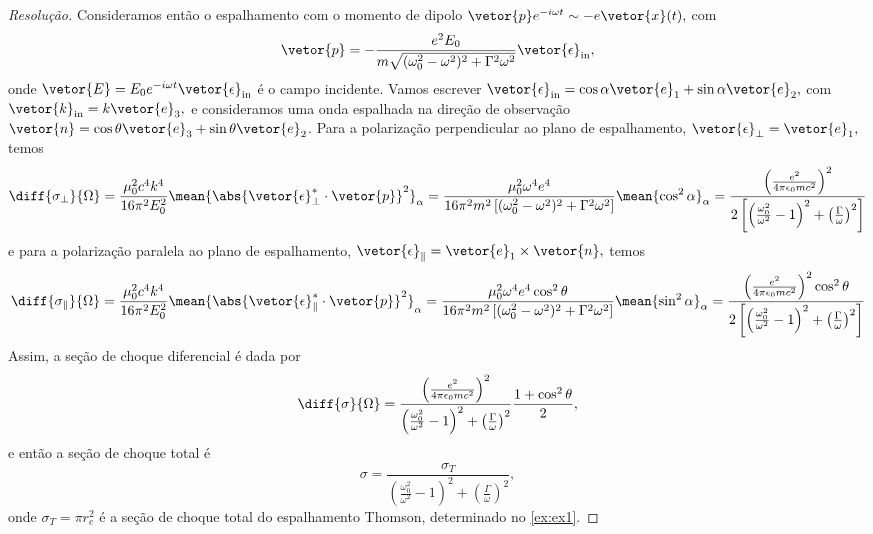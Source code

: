 \begin{proof}[Resolução]
   Consideramos então o espalhamento com o momento de dipolo \(\vetor{p}e^{-i \omega t} \sim -e \vetor{x}(t),\) com
   \begin{equation*}
      \vetor{p} = -\frac{e^2 E_0}{m \sqrt{(\omega_0^2 - \omega^2)^2 + \Gamma^2 \omega^2}}\vetor{\epsilon}_{\mathrm{in}},
   \end{equation*}
   onde \(\vetor{E} = E_0 e^{-i \omega t} \vetor{\epsilon}_\mathrm{in}\) é o campo incidente. Vamos escrever \(\vetor{\epsilon}_{\mathrm{in}} = \cos \alpha \vetor{e}_1 + \sin \alpha \vetor{e}_2,\) com \(\vetor{k}_{\mathrm{in}} = k \vetor{e}_3,\) e consideramos uma onda espalhada na direção de observação \(\vetor{n} = \cos\theta \vetor{e}_3 + \sin\theta \vetor{e}_2\). Para a polarização perpendicular ao plano de espalhamento, \(\vetor{\epsilon}_{\perp} = \vetor{e}_1,\) temos
   \begin{equation*}
      \diff{\sigma_{\perp}}{\Omega} = \frac{\mu_0^2 c^4 k^4}{16 \pi^2 E_0^2}\mean{\abs{\vetor{\epsilon}_{\perp}^* \cdot \vetor{p}}^2}_{\alpha} = \frac{\mu_0^2 \omega^4 e^4}{16 \pi^2 m^2 \left[(\omega_0^2 - \omega^2)^2 + \Gamma^2 \omega^2\right]} \mean{\cos^2 \alpha}_\alpha = \frac{\left(\frac{e^2}{4\pi \epsilon_0 m c^2}\right)^2}{2\left[\left(\frac{\omega_0^2}{\omega^2} - 1\right)^2 + \left(\frac{\Gamma}{\omega}\right)^2\right]}
   \end{equation*}
   e para a polarização paralela ao plano de espalhamento, \(\vetor{\epsilon}_\parallel = \vetor{e}_1 \times \vetor{n},\) temos
   \begin{equation*}
      \diff{\sigma_{\parallel}}{\Omega} = \frac{\mu_0^2 c^4 k^4}{16 \pi^2 E_0^2}\mean{\abs{\vetor{\epsilon}_{\parallel}^* \cdot \vetor{p}}^2}_{\alpha} = \frac{\mu_0^2 \omega^4 e^4\cos^2\theta}{16 \pi^2 m^2 \left[(\omega_0^2 - \omega^2)^2 + \Gamma^2 \omega^2\right]} \mean{\sin^2 \alpha}_\alpha = \frac{\left(\frac{e^2}{4\pi \epsilon_0 m c^2}\right)^2\cos^2\theta}{2\left[\left(\frac{\omega_0^2}{\omega^2} - 1\right)^2 + \left(\frac{\Gamma}{\omega}\right)^2\right]}
   \end{equation*}
   Assim, a seção de choque diferencial é dada por
   \begin{equation*}
      \diff{\sigma}{\Omega} = \frac{\left(\frac{e^2}{4\pi \epsilon_0 m c^2}\right)^2}{\left(\frac{\omega_0^2}{\omega^2} - 1\right)^2 + \left(\frac{\Gamma}{\omega}\right)^2} \frac{1 + \cos^2\theta}{2},
   \end{equation*}
   e então a seção de choque total é
   \begin{equation*}
      \sigma = \frac{\sigma_T}{\left(\frac{\omega_0^2}{\omega^2} - 1\right)^2 + \left(\frac{\Gamma}{\omega}\right)^2},
   \end{equation*}
   onde \(\sigma_T = \pi r_e^2\) é a seção de choque total do espalhamento Thomson, determinado no \cref{ex:ex1}.
\end{proof}
